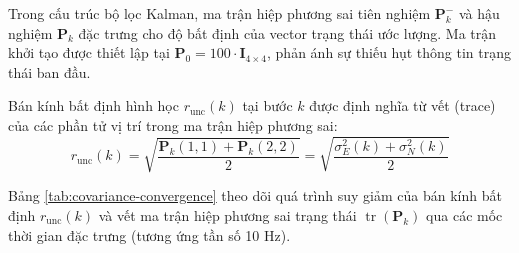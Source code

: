 \hspace{0.5cm} Trong cấu trúc bộ lọc Kalman, ma trận hiệp phương sai tiên nghiệm $\mathbf{P}_k^-$ và hậu nghiệm $\mathbf{P}_k$ đặc trưng cho độ bất định của vector trạng thái ước lượng. Ma trận khởi tạo được thiết lập tại $\mathbf{P}_0 = 100 \cdot \mathbf{I}_{4 \times 4}$, phản ánh sự thiếu hụt thông tin trạng thái ban đầu.

Bán kính bất định hình học $r_{\text{unc}}(k)$ tại bước $k$ được định nghĩa từ vết (trace) của các phần tử vị trí trong ma trận hiệp phương sai:
\begin{equation}
r_{\text{unc}}(k) = \sqrt{\frac{\mathbf{P}_k(1,1) + \mathbf{P}_k(2,2)}{2}} = \sqrt{\frac{\sigma_E^2(k) + \sigma_N^2(k)}{2}}
\label{eq:uncertainty-radius}
\end{equation}

Bảng \ref{tab:covariance-convergence} theo dõi quá trình suy giảm của bán kính bất định $r_{\text{unc}}(k)$ và vết ma trận hiệp phương sai trạng thái $\operatorname{tr}(\mathbf{P}_k)$ qua các mốc thời gian đặc trưng (tương ứng tần số 10 Hz).

\begin{table}[H]
\centering
\caption{Diễn biến hội tụ của ma trận hiệp phương sai trạng thái $\mathbf{P}_k$ theo bước thời gian}
\label{tab:covariance-convergence}
\end{table}

